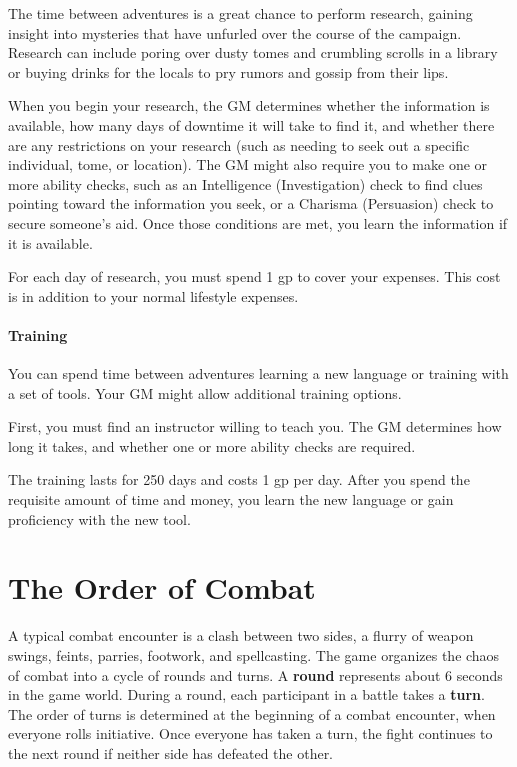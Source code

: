 The time between adventures is a great chance to perform research, gaining insight into mysteries that have unfurled over the course of the campaign. Research can include poring over dusty tomes and crumbling scrolls in a library or buying drinks for the locals to pry rumors and gossip from their lips.

When you begin your research, the GM determines whether the information is available, how many days of downtime it will take to find it, and whether there are any restrictions on your research (such as needing to seek out a specific individual, tome, or location). The GM might also require you to make one or more ability checks, such as an Intelligence (Investigation) check to find clues pointing toward the information you seek, or a Charisma (Persuasion) check to secure someone's aid. Once those conditions are met, you learn the information if it is available.

For each day of research, you must spend 1 gp to cover your expenses. This cost is in addition to your normal lifestyle expenses.

\subsubsection{Training}

You can spend time between adventures learning a new language or training with a set of tools. Your GM might allow additional training options.

First, you must find an instructor willing to teach you. The GM determines how long it takes, and whether one or more ability checks are required.

The training lasts for 250 days and costs 1 gp per day. After you spend the requisite amount of time and money, you learn the new language or gain proficiency with the new tool.

\chapter{The Order of Combat}
A typical combat encounter is a clash between two sides, a flurry of weapon swings, feints, parries, footwork, and spellcasting. The game organizes the chaos of combat into a cycle of rounds and turns. A
\textbf{round} represents about 6 seconds in the game world. During a round, each participant in a battle takes a \textbf{turn}. The order of turns is determined at the beginning of a combat encounter, when everyone rolls initiative. Once everyone has taken a turn, the fight continues to the next round if neither side has defeated the other.

